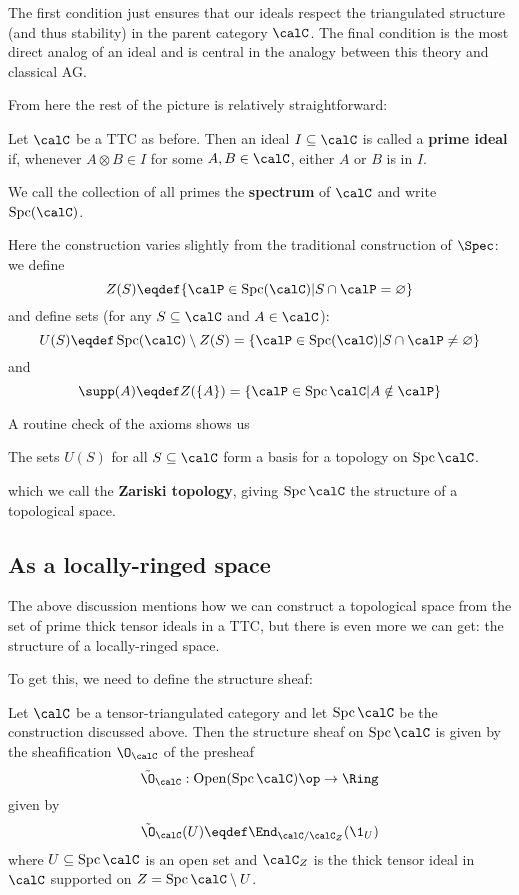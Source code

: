 \documentclass[12pt]{article}
\DeclareMathOperator{\Spc}{Spc}
\begin{document}
\begin{rmk}
	The first condition just ensures that our ideals respect the triangulated structure (and thus stability) in the parent category $\calC$. 
	The final condition is the most direct analog of an ideal and is central in the analogy between this theory and classical AG.
\end{rmk}
From here the rest of the picture is relatively straightforward:
\begin{defn}
	Let $\calC$ be a TTC as before. Then an ideal $I\subseteq\calC$ is called a \textbf{prime ideal}
	if, whenever $A\otimes B\in I$ for some $A,B\in \calC$, either $A$ or $B$ is in $I$.

	We call the collection of all primes the \textbf{spectrum} of $\calC$ and write 
	$\operatorname{Spc}(\calC)$.
\end{defn}

Here the construction varies slightly from the traditional construction of $\Spec$: we define 
\[Z(S)\eqdef\{\calP\in\Spc(\calC)|S\cap\calP=\varnothing\}\]
and define sets (for any $S\subseteq\calC$ and $A\in \calC$):
\[U(S)\eqdef \Spc(\calC)\setminus Z(S)=\{\calP\in\Spc(\calC)|S\cap \calP\ne\varnothing\}\]
and
\[\supp(A)\eqdef Z(\{A\})=\{\calP\in\Spc\calC|A\notin \calP\}\]

A routine check of the axioms shows us
\begin{lem}
	The sets $U(S)$ for all $S\subseteq\calC$ form a basis for a topology on $\Spc\calC$.
\end{lem}
which we call the \textbf{Zariski topology}, giving $\Spc\calC$ the structure of a topological space.

\subsection{As a locally-ringed space}
The above discussion mentions how we can construct a topological space from the set of prime thick tensor ideals 
in a TTC, but there is even more we can get: the structure of a locally-ringed space. 

To get this, we need to define the structure sheaf:
\begin{defn}
	Let $\calC$ be a tensor-triangulated category and let $\Spc\calC$ be the construction discussed above. Then the structure sheaf on $\Spc\calC$ is given by the 
	sheafification $\O_\calC$ of the presheaf 
	\[\tilde\O_\calC:\operatorname{Open}(\Spc\calC)\op\to \Ring\]
	given by 
	\[\tilde\O_\calC(U)\eqdef \End_{\calC/\calC_Z}(\1_U)\]
	where $U\subseteq\Spc\calC$ is an open set and $\calC_Z$ is the thick tensor ideal in $\calC$ supported 
	on $Z=\Spc\calC\setminus U$.
\end{defn}
\end{document}
